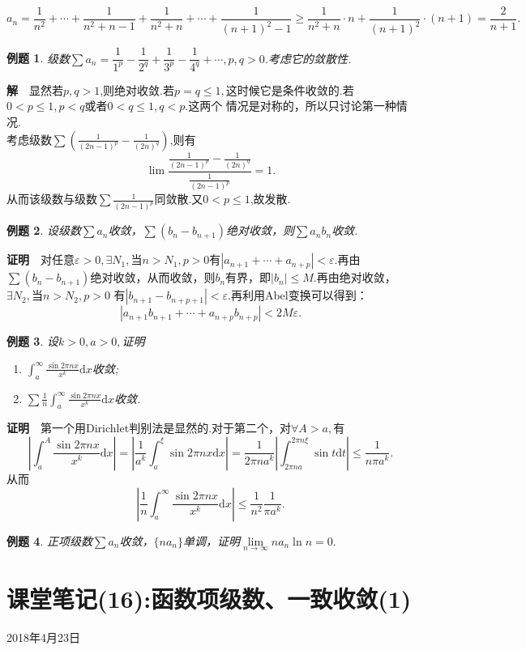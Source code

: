 \documentclass[UTF8]{article}
\newcommand{\dx}{\mathrm{d}x}
\newcommand{\zm}{\textbf{证明}$\quad$}
\newcommand{\jie}{\textbf{解}$\quad$}
\newtheorem{exa}{\hspace{2em}例题}[section]
\begin{document}
$$a_n=\frac{1}{n^2}+\cdots+\frac{1}{n^2+n-1}+\frac{1}{n^2+n}+\cdots+\frac{1}{(n+1)^2-1}
\ge\frac{1}{n^2+n}\cdot n+\frac{1}{(n+1)^2}\cdot(n+1)=\frac{2}{n+1}.$$
\begin{exa}
  级数$\sum a_n=\dfrac{1}{1^p}-\dfrac{1}{2^q}+\dfrac{1}{3^p}-\dfrac{1}{4^q}+\cdots,p,q>0$.考虑它的敛散性.
\end{exa}
\jie 显然若$p,q>1$,则绝对收敛.若$p=q\le 1,$这时候它是条件收敛的.若$0<p\le 1,p<q$或者$0<q\le 1,q<p.$这两个
情况是对称的，所以只讨论第一种情况.\\
考虑级数$\sum(\frac{1}{(2n-1)^p}-\frac{1}{(2n)^q})$,则有
$$\lim\frac{\frac{1}{(2n-1)^p}-\frac{1}{(2n)^q}}{\frac{1}{(2n-1)^p}}=1.$$
从而该级数与级数$\sum\frac{1}{(2n-1)^p}$同敛散.又$0<p\le1$,故发散.
\begin{exa}
  设级数$\sum a_n$收敛，$\sum(b_n-b_{n+1})$绝对收敛，则$\sum a_nb_n$收敛.
\end{exa}
\zm 对任意$\varepsilon>0,\exists N_1,$当$n>N_1,p>0$有$|a_{n+1}+\cdots+a_{n+p}|<\varepsilon.$再由
$\sum(b_n-b_{n+1})$绝对收敛，从而收敛，则$b_n$有界，即$|b_n|\le M.$再由绝对收敛，$\exists N_2,$当$n>N_2,p>0$
有$|b_{n+1}-b_{n+p+1}|<\varepsilon.$再利用Abel变换可以得到：
$$|a_{n+1}b_{n+1}+\cdots+a_{n+p}b_{n+p}|<2M\varepsilon.$$
\begin{exa}
  设$k>0,a>0,$证明
  \begin{enumerate}
    \item $\int_a^\infty\frac{\sin2\pi nx}{x^k}\dx$收敛;
    \item $\sum\frac{1}{n}\int_a^\infty\frac{\sin2\pi nx}{x^k}\dx$收敛.
  \end{enumerate}
\end{exa}
\zm 第一个用Dirichlet判别法是显然的.对于第二个，对$\forall A>a,$有
$$\left|\int_a^A\frac{\sin2\pi nx}{x^k}\dx\right|=\left|\frac{1}{a^k}\int_a^\xi\sin2\pi nx\dx\right|
=\frac{1}{2\pi na^k}\left|\int_{2\pi na}^{2\pi n\xi}\sin t\mathrm{d}t\right|\le\frac{1}{n\pi a^k}.$$
从而
$$\left|\frac{1}{n}\int_a^\infty\frac{\sin2\pi nx}{x^k}\dx\right|\le\frac{1}{n^2}\frac{1}{\pi a^k}.$$
\begin{exa}
  正项级数$\sum a_n$收敛，$\{na_n\}$单调，证明$\lim\limits_{n\to\infty}na_n\ln n=0.$
\end{exa}
\clearpage

\section{课堂笔记(16):函数项级数、一致收敛(1)}
\begin{center}
  2018年4月23日
\end{center}
\end{document}
